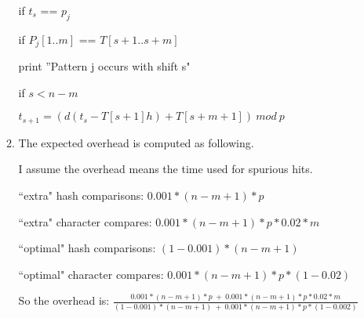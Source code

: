 \documentclass[11pt,letterpaper,oneside]{article}
\begin{document}
\begin{enumerate}
\begin{enumerate}
\hspace{6em}                if $t_s$ == $p_j$

\hspace{7em}                    if $P_j[1..m]$ == $T[s+1..s+m]$

\hspace{8em}                        print ''Pattern j occurs with shift s"

\hspace{4em}        if $s < n-m$

\hspace{5em}            $t_{s+1} = (d(t_s - T[s+1]h) + T[s+m+1])\ mod\ p$

\null

\item The expected overhead is computed as following.

I assume the overhead means the time used for spurious hits.

``extra" hash comparisons: $0.001*(n-m+1)*p$

``extra" character compares: $0.001*(n-m+1)*p * 0.02*m$

``optimal" hash comparisons: $(1-0.001)*(n-m+1)$

``optimal" character compares: $0.001*(n-m+1)*p * (1-0.02)$

So the overhead is: $\frac{0.001*(n-m+1)*p\ +\ 0.001*(n-m+1)*p*0.02*m}{(1-0.001)*(n-m+1)\ +\ 0.001*(n-m+1)*p*(1-0.002)}$

\end{enumerate}

\end{enumerate}
\end{document}
